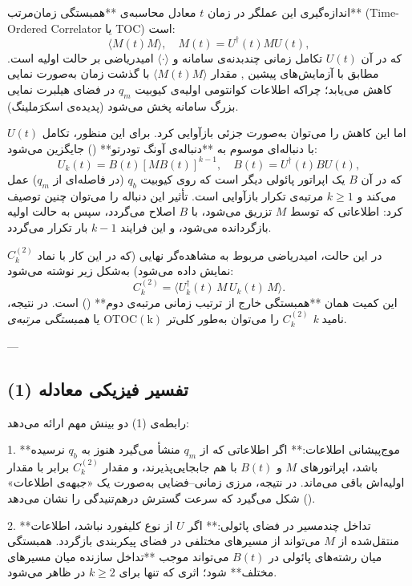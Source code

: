 اندازه‌گیری این عملگر در زمان \( t \) معادل محاسبه‌ی **همبستگی زمان‌مرتب** (Time-Ordered Correlator یا TOC) است:
\[
\langle M(t) M \rangle, \quad M(t) = U^\dagger(t) M U(t),
\]
که در آن \( U(t) \) تکامل زمانی چند‌بدنه‌ی سامانه و \( \langle \cdot \rangle \) امیدریاضی بر حالت اولیه است.  
مطابق با آزمایش‌های پیشین \cite{Kaufman2016, Zhang2023}, مقدار \(\langle M(t) M \rangle\) با گذشت زمان به‌صورت نمایی کاهش می‌یابد؛ چراکه اطلاعات کوانتومی اولیه‌ی کیوبیت \( q_m \) در فضای هیلبرت نمایی بزرگ سامانه پخش می‌شود (پدیده‌ی اسکرَملینگ).

اما این کاهش را می‌توان به‌صورت جزئی بازآوایی کرد. برای این منظور، تکامل \( U(t) \) با دنباله‌ای موسوم به **دنباله‌ی آونگ تودرتو** () جایگزین می‌شود:
\[
U_k(t) = B(t) [M B(t)]^{k-1}, \quad B(t) = U^\dagger(t) B U(t),
\]
که در آن \( B \) یک اپراتور پائولی دیگر است که روی کیوبیت \( q_b \) (در فاصله‌ای از \( q_m \)) عمل می‌کند و \( k \ge 1 \) مرتبه‌ی تکرار بازآوایی است.  
تأثیر این دنباله را می‌توان چنین توصیف کرد: اطلاعاتی که توسط \( M \) تزریق می‌شود، با \( B \) اصلاح می‌گردد، سپس به حالت اولیه بازگردانده می‌شود، و این فرایند \( k-1 \) بار تکرار می‌گردد.

در این حالت، امیدریاضی مربوط به مشاهده‌گر نهایی (که در این کار با نماد \( C^{(2)}_k \) نمایش داده می‌شود) به‌شکل زیر نوشته می‌شود:
\[
C^{(2)}_k = \langle U_k^\dagger(t)\, M\, U_k(t)\, M \rangle.
\tag{1}
\]
این کمیت همان **همبستگی خارج از ترتیب زمانی مرتبه‌ی دوم** () است. در نتیجه، \( C^{(2)}_k \) را می‌توان به‌طور کلی‌تر \(\mathrm{OTOC(k)}\) یا \textit{همبستگی مرتبه‌ی k} نامید.

---

\subsection{تفسیر فیزیکی معادله (1)}

رابطه‌ی (1) دو بینش مهم ارائه می‌دهد:

1. **موج‌پیشانی اطلاعات:**  
اگر اطلاعاتی که از \( q_m \) منشأ می‌گیرد هنوز به \( q_b \) نرسیده باشد، اپراتورهای \( M \) و \( B(t) \) با هم جابجایی‌پذیرند، و مقدار \( C^{(2)}_k \) برابر با مقدار اولیه‌اش باقی می‌ماند.  
در نتیجه، مرزی زمانی–فضایی به‌صورت یک «جبهه‌ی اطلاعات» () شکل می‌گیرد که سرعت گسترش درهم‌تنیدگی را نشان می‌دهد.

2. **تداخل چندمسیر در فضای پائولی:**  
اگر \( U \) از نوع کلیفورد نباشد، اطلاعات منتقل‌شده از \( M \) می‌تواند از مسیرهای مختلفی در فضای پیکربندی بازگردد. همبستگی میان رشته‌های پائولی در \( B(t) \) می‌تواند موجب **تداخل سازنده میان مسیرهای مختلف** شود؛ اثری که تنها برای \( k \ge 2 \) در  ظاهر می‌شود.

